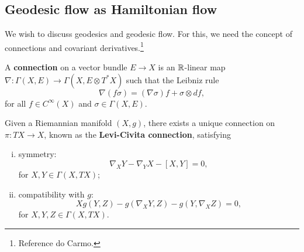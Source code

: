 \documentclass{amsart}
\begin{document}
\subsection{Geodesic flow as Hamiltonian flow}

We wish to discuss geodesics and geodesic flow. For this, we need the concept
of connections and covariant derivatives.\footnote{Reference do Carmo.}
\begin{definition}
    A \textbf{connection} on a vector bundle $E\to X$ is an $\mathbb{R}$-linear map
    $\nabla:\Gamma(X,E)\to\Gamma(X,E\otimes T^*X)$ such that the Leibniz rule
    \begin{equation*}
        \nabla(f\sigma) = (\nabla \sigma)f + \sigma\otimes df,
    \end{equation*}
    for all $f\in C^\infty(X)$ and $\sigma\in\Gamma(X,E)$.
\end{definition}

\begin{theorem}
    Given a Riemannian manifold $(X,g)$, there exists a unique connection on $\pi:TX\to X$,
    known as the \textbf{Levi-Civita connection}, satisfying
    \begin{enumerate}[(i)]
        \item symmetry:
            \begin{equation*}
                \nabla_XY-\nabla_YX-[X,Y]=0,
            \end{equation*}
            for $X,Y\in\Gamma(X,TX)$;
        \item compatibility with $g$:
            \begin{equation*}
                Xg(Y,Z)-g(\nabla_XY,Z)-g(Y,\nabla_XZ)=0,
            \end{equation*}
            for $X,Y,Z\in\Gamma(X,TX)$.
    \end{enumerate}
\end{theorem}
\end{document}
